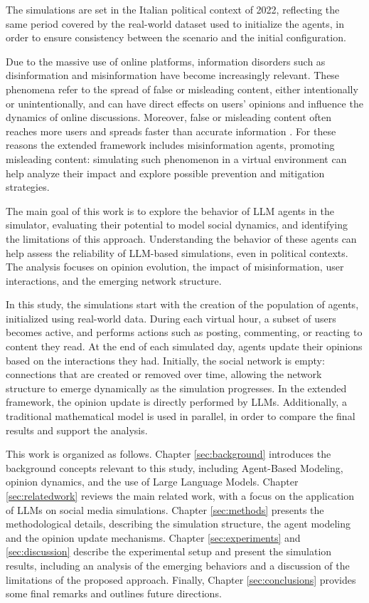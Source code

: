 The simulations are set in the Italian political context of 2022, reflecting the same period covered by the real-world dataset used to initialize the agents, in order to ensure consistency between the scenario and the initial configuration.

Due to the massive use of online platforms, information disorders such as disinformation and misinformation have become increasingly relevant.
These phenomena refer to the spread of false or misleading content, either intentionally or unintentionally, and can have direct effects on users' opinions and influence the dynamics of online discussions.
Moreover, false or misleading content often reaches more users and spreads faster than accurate information \cite{kumar2018falseinformationwebsocial}.
For these reasons the extended framework includes misinformation agents, promoting misleading content: simulating such phenomenon in a virtual environment can help analyze their impact and explore possible prevention and mitigation strategies.

The main goal of this work is to explore the behavior of LLM agents in the simulator, evaluating their potential to model social dynamics, and identifying the limitations of this approach.
Understanding the behavior of these agents can help assess the reliability of LLM-based simulations, even in political contexts.
The analysis focuses on opinion evolution, the impact of misinformation, user interactions, and the emerging network structure.


\medskip
In this study, the simulations start with the creation of the population of agents, initialized using real-world data.
During each virtual hour, a subset of users becomes active, and performs actions such as posting, commenting, or reacting to content they read.
At the end of each simulated day, agents update their opinions based on the interactions they had.
Initially, the social network is empty: connections that are created or removed over time, allowing the network structure to emerge dynamically as the simulation progresses.
In the extended framework, the opinion update is directly performed by LLMs.
Additionally, a traditional mathematical model is used in parallel, in order to compare the final results and support the analysis.


\medskip
This work is organized as follows.
Chapter \ref{sec:background} introduces the background concepts relevant to this study, including Agent-Based Modeling, opinion dynamics, and the use of Large Language Models.
Chapter \ref{sec:relatedwork} reviews the main related work, with a focus on the application of LLMs on social media simulations.
Chapter \ref{sec:methods} presents the methodological details, describing the simulation structure, the agent modeling and the opinion update mechanisms.
Chapter \ref{sec:experiments} and \ref{sec:discussion} describe the experimental setup and present the simulation results, including an analysis of the emerging behaviors and a discussion of the limitations of the proposed approach.
Finally, Chapter \ref{sec:conclusions} provides some final remarks and outlines future directions.




